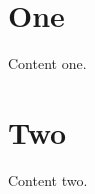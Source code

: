 \documentclass{article}
\begin{document}
\tableofcontents
\section{One}
Content one.
\section{Two}
Content two.
\end{document}
